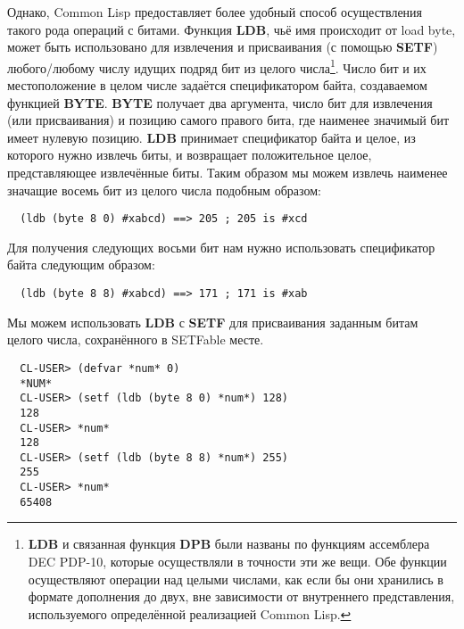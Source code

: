 Однако, Common Lisp предоставляет более удобный способ осуществления такого рода операций
с битами. Функция \textbf{LDB}, чьё имя происходит от load byte, может быть использовано
для извлечения и присваивания (с помощью \textbf{SETF}) любого/любому числу идущих подряд
бит из целого числа\footnote{\textbf{LDB} и связанная функция \textbf{DPB} были названы по
  функциям ассемблера DEC PDP-10, которые осуществляли в точности эти же вещи. Обе функции
  осуществляют операции над целыми числами, как если бы они хранились в формате дополнения
  до двух, вне зависимости от внутреннего представления, используемого определённой
  реализацией Common Lisp.}. Число бит и их местоположение в целом числе задаётся
спецификатором байта, создаваемом функцией \textbf{BYTE}. \textbf{BYTE} получает два
аргумента, число бит для извлечения (или присваивания) и позицию самого правого бита, где
наименее значимый бит имеет нулевую позицию. \textbf{LDB} принимает спецификатор байта и
целое, из которого нужно извлечь биты, и возвращает положительное целое, представляющее
извлечённые биты. Таким образом мы можем извлечь наименее значащие восемь бит из целого
числа подобным образом:

\begin{lstlisting}
  (ldb (byte 8 0) #xabcd) ==> 205 ; 205 is #xcd
\end{lstlisting}

Для получения следующих восьми бит нам нужно использовать спецификатор байта  следующим образом:

\begin{lstlisting}
  (ldb (byte 8 8) #xabcd) ==> 171 ; 171 is #xab
\end{lstlisting}

Мы можем использовать \textbf{LDB} с \textbf{SETF} для присваивания заданным битам целого
числа, сохранённого в SETFable месте.

\begin{verbatim}
  CL-USER> (defvar *num* 0)
  *NUM*
  CL-USER> (setf (ldb (byte 8 0) *num*) 128)
  128
  CL-USER> *num*
  128
  CL-USER> (setf (ldb (byte 8 8) *num*) 255)
  255
  CL-USER> *num*
  65408
\end{verbatim}

